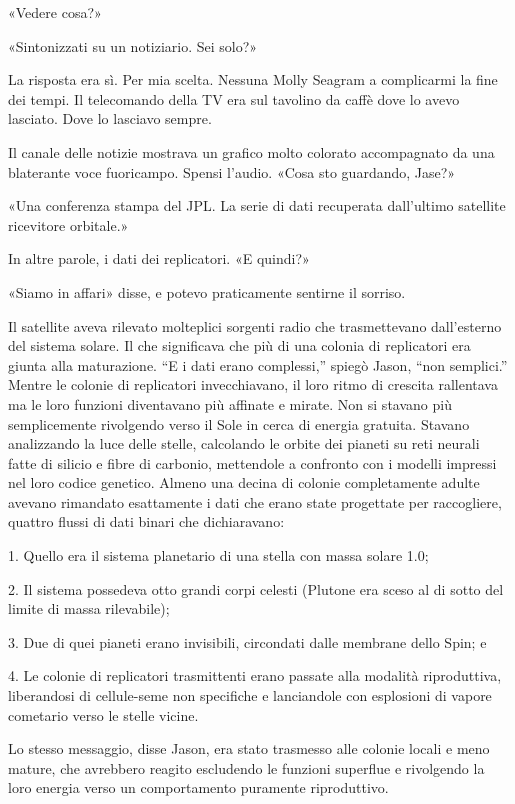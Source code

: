 «Vedere cosa?»

«Sintonizzati su un notiziario. Sei solo?»

La risposta era sì. Per mia scelta. Nessuna Molly Seagram a complicarmi
la fine dei tempi. Il telecomando della TV era sul tavolino da caffè
dove lo avevo lasciato. Dove lo lasciavo sempre.

Il canale delle notizie mostrava un grafico molto colorato accompagnato
da una blaterante voce fuoricampo. Spensi l'audio. «Cosa sto guardando,
Jase?»

«Una conferenza stampa del JPL. La serie di dati recuperata dall'ultimo
satellite ricevitore orbitale.»

In altre parole, i dati dei replicatori. «E quindi?»

«Siamo in affari» disse, e potevo praticamente sentirne il sorriso.

Il satellite aveva rilevato molteplici sorgenti radio che trasmettevano
dall'esterno del sistema solare. Il che significava che più di una
colonia di replicatori era giunta alla maturazione. ``E i dati erano
complessi,'' spiegò Jason, ``non semplici.'' Mentre le colonie di
replicatori invecchiavano, il loro ritmo di crescita rallentava ma le
loro funzioni diventavano più affinate e mirate. Non si stavano più
semplicemente rivolgendo verso il Sole in cerca di energia gratuita.
Stavano analizzando la luce delle stelle, calcolando le orbite dei
pianeti su reti neurali fatte di silicio e fibre di carbonio, mettendole
a confronto con i modelli impressi nel loro codice genetico. Almeno una
decina di colonie completamente adulte avevano rimandato esattamente i
dati che erano state progettate per raccogliere, quattro flussi di dati
binari che dichiaravano:

1. Quello era il sistema planetario di una stella con massa solare 1.0;

2. Il sistema possedeva otto grandi corpi celesti (Plutone era sceso al
di sotto del limite di massa rilevabile);

3. Due di quei pianeti erano invisibili, circondati dalle membrane dello
Spin; e

4. Le colonie di replicatori trasmittenti erano passate alla modalità
riproduttiva, liberandosi di cellule-seme non specifiche e lanciandole
con esplosioni di vapore cometario verso le stelle vicine.

Lo stesso messaggio, disse Jason, era stato trasmesso alle colonie
locali e meno mature, che avrebbero reagito escludendo le funzioni
superflue e rivolgendo la loro energia verso un comportamento puramente
riproduttivo.

